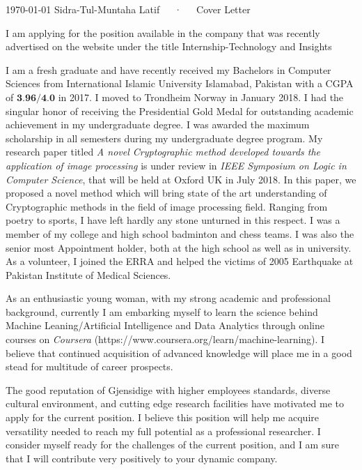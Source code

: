 \documentclass[11pt, a4paper]{awesome-cv}
\begin{document}
	
	\makecvheader
	
	\makecvfooter
	{\today}
	{Sidra-Tul-Muntaha Latif~~~·~~~Cover Letter}
	{}
	
	\makelettertitle
	
	\begin{cvletter}
		
		
		I am applying for the position available in the company that was recently advertised on the website under the title Internship-Technology and Insights
		
		I am a fresh graduate and have recently received my Bachelors in Computer Sciences from International Islamic University Islamabad, Pakistan with a CGPA of $\textbf{3.96/4.0}$ in 2017. I moved to Trondheim Norway in January 2018. 
 I had the singular honor of receiving the Presidential Gold Medal for outstanding academic achievement in my undergraduate degree. I was awarded the maximum scholarship in all semesters during my undergraduate degree program.	My research paper titled \emph{A novel Cryptographic method developed towards the application of image processing} is under review in \emph{IEEE Symposium on Logic in Computer Science}, that will be held at Oxford UK in July 2018. In this paper, we proposed a novel method which will bring state of the art understanding of Cryptographic methods in the field of image processing field.  Ranging from poetry to sports, I have left hardly any stone unturned in this respect. I was a member of my college and high school badminton and chess teams. I was also the senior most Appointment holder, both at the high school as well as in university. As a volunteer, I joined the ERRA and helped the victims of 2005 Earthquake at Pakistan Institute of Medical Sciences.
 
 As an enthusiastic young woman, with my strong academic and professional background, currently I am embarking myself to learn the science behind Machine Leaning/Artificial Intelligence and Data Analytics through online courses on \emph{Coursera} (https://www.coursera.org/learn/machine-learning). I believe that continued acquisition of advanced knowledge will place me in a good stead for  multitude of career prospects. 

	  
The good reputation of Gjensidige with higher employees standards, diverse cultural environment, and cutting edge research facilities have motivated me to apply for the current position. I believe this position will help me acquire versatility needed to reach my full potential as a professional researcher. I consider myself ready for the challenges of the current position, and I am sure that I will contribute very positively to your dynamic company.
	\end{cvletter}
	
	
	\makeletterclosing
	
\end{document}
